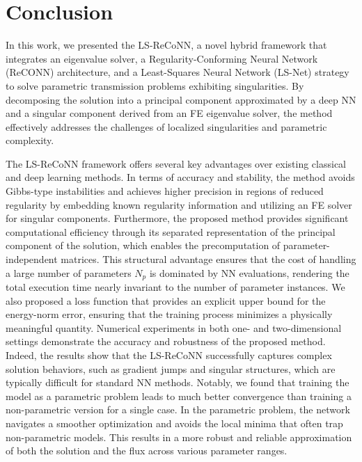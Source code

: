 \documentclass[oneside]{article}
\begin{document}

\section{Conclusion}\label{Conclusion}
In this work, we presented the LS-ReCoNN, a novel hybrid framework that integrates an eigenvalue solver, a Regularity-Conforming Neural Network (ReCONN) architecture, and a Least-Squares Neural Network (LS-Net) strategy to solve parametric transmission problems exhibiting singularities. By decomposing the solution into a principal component approximated by a deep NN and a singular component derived from an FE eigenvalue solver, the method effectively addresses the challenges of localized singularities and parametric complexity.

\noindent The LS-ReCoNN framework offers several key advantages over existing classical and deep learning methods. In terms of accuracy and stability, the method avoids Gibbs-type instabilities and achieves higher precision in regions of reduced regularity by embedding known regularity information and utilizing an FE solver for singular components. Furthermore, the proposed method provides significant computational efficiency through its separated representation of the principal component of the solution, which enables the precomputation of parameter-independent matrices. This structural advantage ensures that the cost of handling a large number of parameters $N_p$ is dominated by NN evaluations, rendering the total execution time nearly invariant to the number of parameter instances. We also proposed a loss function that provides an explicit upper bound for the energy-norm error, ensuring that the training process minimizes a physically meaningful quantity. Numerical experiments in both one- and two-dimensional settings demonstrate the accuracy and robustness of the proposed method. Indeed, the results show that the LS-ReCoNN successfully captures complex solution behaviors, such as gradient jumps and singular structures, which are typically difficult for standard NN methods. Notably, we found that training the model as a parametric problem leads to much better convergence than training a non-parametric version for a single case. In the parametric problem, the network navigates a smoother optimization and avoids the local minima that often trap non-parametric models. This results in a more robust and reliable approximation of both the solution and the flux across various parameter ranges.
\end{document}
